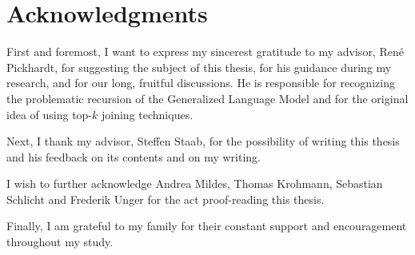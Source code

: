 \chapter*{Acknowledgments}

First and foremost, I want to express my sincerest gratitude to my advisor,
Ren{\'e} Pickhardt, for suggesting the subject of this thesis, for his guidance
during my research, and for our long, fruitful discussions.
He is responsible for recognizing the problematic recursion of the Generalized
Language Model and for the original idea of using top-$k$ joining techniques.

Next, I thank my advisor, Steffen Staab, for the possibility of writing this
thesis and his feedback on its contents and on my writing.

I wish to further acknowledge Andrea Mildes, Thomas Krohmann,
Sebastian Schlicht and Frederik Unger for the act proof-reading this thesis.

Finally, I am grateful to my family for their constant support and encouragement
throughout my study.
